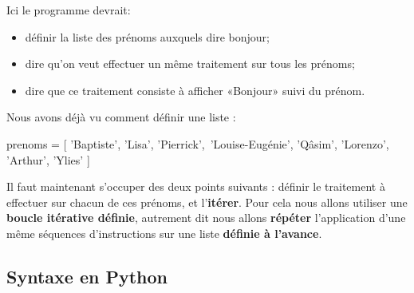 Ici le programme devrait:
\begin{itemize}
\item définir la liste des prénoms auxquels dire bonjour;
\item dire qu'on veut effectuer un même traitement sur tous les prénoms;
\item dire que ce traitement consiste à afficher «Bonjour» suivi du prénom.
\end{itemize}


Nous avons déjà vu comment définir une liste :

\begin{pyverbatim}
prenoms = [ 'Baptiste', 'Lisa', 'Pierrick',\
'Louise-Eugénie', 'Qâsim', 'Lorenzo', 'Arthur', 'Ylies' ]
\end{pyverbatim}

Il faut maintenant s'occuper des deux points suivants : définir le traitement à effectuer sur 
chacun de ces 
prénoms, et l'\textbf{itérer}. Pour cela nous allons utiliser une \textbf{boucle itérative 
définie}, autrement dit nous allons \textbf{répéter} l'application d'une même séquences
d'instructions 
sur une liste \textbf{définie à l'avance}.




\subsection{Syntaxe en Python}

